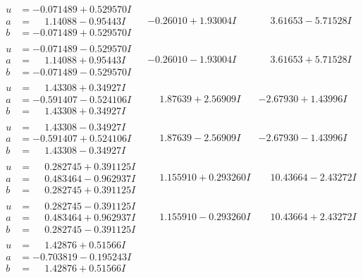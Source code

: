\documentclass[1p]{elsarticle_modified}
\theoremstyle{definition}
\begin{document}
$$\begin{array}{c|c|c}
\begin{aligned}
u &= -0.071489 + 0.529570 I \\
a &= \phantom{-}1.14088 - 0.95443 I \\
b &= -0.071489 + 0.529570 I\end{aligned}
 & -0.26010 + 1.93004 I & \phantom{-}3.61653 - 5.71528 I \\ \hline\begin{aligned}
u &= -0.071489 - 0.529570 I \\
a &= \phantom{-}1.14088 + 0.95443 I \\
b &= -0.071489 - 0.529570 I\end{aligned}
 & -0.26010 - 1.93004 I & \phantom{-}3.61653 + 5.71528 I \\ \hline\begin{aligned}
u &= \phantom{-}1.43308 + 0.34927 I \\
a &= -0.591407 - 0.524106 I \\
b &= \phantom{-}1.43308 + 0.34927 I\end{aligned}
 & \phantom{-}1.87639 + 2.56909 I & -2.67930 + 1.43996 I \\ \hline\begin{aligned}
u &= \phantom{-}1.43308 - 0.34927 I \\
a &= -0.591407 + 0.524106 I \\
b &= \phantom{-}1.43308 - 0.34927 I\end{aligned}
 & \phantom{-}1.87639 - 2.56909 I & -2.67930 - 1.43996 I \\ \hline\begin{aligned}
u &= \phantom{-}0.282745 + 0.391125 I \\
a &= \phantom{-}0.483464 - 0.962937 I \\
b &= \phantom{-}0.282745 + 0.391125 I\end{aligned}
 & \phantom{-}1.155910 + 0.293260 I & \phantom{-}10.43664 - 2.43272 I \\ \hline\begin{aligned}
u &= \phantom{-}0.282745 - 0.391125 I \\
a &= \phantom{-}0.483464 + 0.962937 I \\
b &= \phantom{-}0.282745 - 0.391125 I\end{aligned}
 & \phantom{-}1.155910 - 0.293260 I & \phantom{-}10.43664 + 2.43272 I \\ \hline\begin{aligned}
u &= \phantom{-}1.42876 + 0.51566 I \\
a &= -0.703819 - 0.195243 I \\
b &= \phantom{-}1.42876 + 0.51566 I\end{aligned}

\end{array}$$
\end{document}
